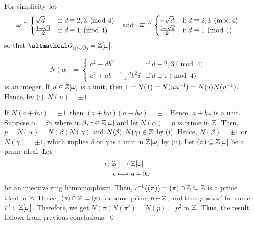 \documentclass[../modern_algebra_2.tex]{subfiles}
\begin{document}
\begin{myclaim}[Proof]
    For simplicity, let
    \[
        \omega \triangleq \begin{cases}
            \sqrt{d} & \text{if}~d \equiv 2, 3 \pmod{4} \\
            \frac{1+\sqrt{d}}{2} & \text{if}~d \equiv 1 \pmod{4}
        \end{cases} \quad\text{and}\quad
        \overline\omega \triangleq \begin{cases}
            -\sqrt{d} & \text{if}~d \equiv 2, 3 \pmod{4} \\
            \frac{1-\sqrt{d}}{2} & \text{if}~d \equiv 1 \pmod{4}
        \end{cases}
    \]
    so that \(\mcal{O}_{\QQ(\sqrt{d})} = \ZZ{}[\omega]\).
\begin{enumerate}[label=(\roman*), listparindent=\parindent]
    \ii
    \[
        N(\alpha) = \begin{cases}
            a^2 - db^2 & \text{if}~d \equiv 2, 3 \pmod{4} \\
            a^2 + ab + \frac{1 - d}{4} b^2 d & \text{if}~d \equiv 1 \pmod{4}
        \end{cases}
    \]
    is an integer.
    \ii
    If \(u \in \ZZ{}[\omega]\) is a unit, then \(1 = N(1) = N(u u^{-1}) = N(u) N(u^{-1})\).
    Hence, by (i), \(N(u) = \pm 1\).

    If \(N(a + b\omega) = \pm 1\), then \((a + b \omega)(a - b \omega) = \pm 1\).
    Hence, \(a + b \omega\) is a unit.
    \ii
    Suppose \(\alpha = \beta \gamma\) where \(\alpha, \beta, \gamma \in \ZZ{}[\omega]\)
    and let \(N(\alpha) = p\) is prime in \(\ZZ\).
    Then, \(p = N(\alpha) = N(\beta) N(\gamma)\) and \(N(\beta), N(\gamma) \in \ZZ\) by (i).
    Hence, \(N(\beta) = \pm 1\) or \(N(\gamma) = \pm 1\),
    which implies \(\beta\) or \(\gamma\) is a unit in \(\ZZ{}[\omega]\) by (ii).
    \ii
    Let \((\pi) \subseteq \ZZ{}[\omega]\) be a prime ideal.
    Let
    \begin{align*}
        \iota \colon \ZZ &\longrightarrow \ZZ{}[\omega] \\
        a &\longmapsto a + 0 \omega
    \end{align*}
    be an injective ring homomorphism.
    Then, \(\iota\inv \bigl((\pi)\bigr) = (\pi) \cap \ZZ \subseteq \ZZ\)
    is a prime ideal in \(\ZZ\).\footnotemark
    Hence, \((\pi) \cap \ZZ = (p)\) for some prime \(p \in \ZZ\),
    and thus \(p = \pi \pi'\) for some \(\pi' \in \ZZ{}[\omega]\).
    Therefore, we get \(N(\pi) N(\pi') = N(p) = p^2\) in \(\ZZ\).
    Thus, the result follows from previous conclusions.
    \qed
\end{enumerate}
\end{myclaim}
\end{document}

